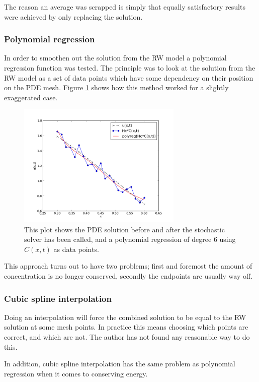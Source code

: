  The reason an average was scrapped is simply that equally satisfactory results were achieved by only replacing the solution.
 
\subsubsection{Polynomial regression}

 In order to smoothen out the solution from the RW model a polynomial regression function was tested. 
 The principle was to look at the solution from the RW model as a set of data points which have some dependency on their position on the PDE mesh. 
 Figure \ref{theory:polyreg} shows how this method worked for a slightly exaggerated case. 
 \begin{figure}[h]
 \centering
 \includegraphics[width=0.7\textwidth]{Figures/polyreg.png}
 \caption[Combination by polynomial regression]{This plot shows the PDE solution before and after the stochastic solver has been called, and a polynomial regression of degree 6 using $C(x,t)$ as data points. }
 \label{theory:polyreg}
 \end{figure}
 This approach turns out to have two problems; first and foremost the amount of concentration is no longer conserved, secondly the endpoints are usually way off.
 
 \subsubsection{Cubic spline interpolation}
 Doing an interpolation will force the combined solution to be equal to the RW solution at some mesh points. In practice this means choosing which points are correct, and which are not. The author has not found any reasonable way to do this. 
 
 In addition, cubic spline interpolation has the same problem as polynomial regression when it comes to conserving energy.
